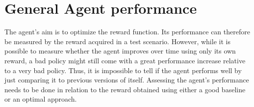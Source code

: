 \iffalse

Reward Modeling:
The reward function prescribes the desirable driving behavior: safe, efficient, and smooth.
• If any pedestrian gets within a small distance Dcol of the vehicle, there is a very large penalty Rcol. This is to ensure safety.
• If the vehicle reaches within a small distance Dgoal of the destination, there is a large reward Rgoal. This is to encourage the vehicle to reach the destination.
• There is a penalty Rspeed = (v−vmax)/vmax, where v and vmax are the current and the maximum vehicle speed, respectively. This encourages driving at a higher speed when it is safe to do so.
• Finally, there is is a small penalty Raccel for the actions ACCELERATE and DECELERATE. This penalizes excessive speed changes and encourages smooth driving.

\fi



% 



\section{General Agent performance}



The agent's aim is to optimize the reward function. Its performance can therefore be measured by the reward acquired in a test scenario. However, while it is possible to measure whether the agent improves over time using only its own reward, a bad policy might still come with a great performance increase relative to a very bad policy. Thus, it is impossible to tell if the agent performs well by just comparing it to previous versions of itself. Assessing the agent's performance needs to be done in relation to the reward obtained using either a good baseline or an optimal approach.

